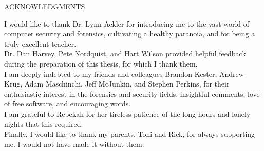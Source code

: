 \onehalfspacing
\begin{center}
ACKNOWLEDGMENTS \\[36pt]
\end{center}

\noindent
I would like to thank Dr. Lynn Ackler for introducing me to the vast world of computer security and forensics, cultivating a healthy
paranoia, and for being a truly excellent teacher.  \\[12pt]

\noindent 
Dr. Dan Harvey, Pete Nordquist, and Hart Wilson provided helpful feedback during the preparation of this thesis, for which
I thank them. \\[12pt]

\noindent
I am deeply indebted to my friends and colleagues Brandon Kester, Andrew Krug, Adam Maschinchi, Jeff McJunkin, and Stephen Perkins,
for their enthusiastic interest in the forensics and security fields, insightful comments, love of free software, and encouraging
words. \\[12pt]
 
\noindent
I am grateful to Rebekah for her tireless patience of the long hours and lonely nights that this required. \\[12pt]
 
\noindent
Finally, I would like to thank my parents, Toni and Rick, for always supporting me. I would not have made it without them. \\[12pt]

\restoregeometry
